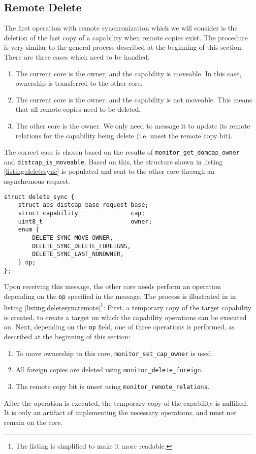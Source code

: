 \subsection{Remote Delete}
The first operation with remote synchronization which we will consider is the deletion of the last copy of a capability when remote copies exist. The procedure is very similar to the general process described at the beginning of this section. There are three cases which need to be handled:
\begin{enumerate}
    \item The current core is the owner, and the capability is moveable. In this case, ownership is transferred to the other core.
    \item The current core is the owner, and the capability is not moveable. This means that all remote copies need to be deleted.
    \item The other core is the owner. We only need to message it to update its remote relations for the capability being delete (i.e. unset the remote copy bit).
\end{enumerate}
The correct case is chosen based on the results of \texttt{monitor\_get\_domcap\_owner} and \texttt{distcap\_is\_moveable}. Based on this, the structure shown in listing \ref{listing:deletesync} is populated and sent to the other core through an asynchronous request.

\begin{lstlisting}[caption={Synchronization message for the delete operation},label={listing:deletesync}]
struct delete_sync {
    struct aos_distcap_base_request base;
    struct capability               cap;
    uint8_t                         owner;
    enum {
        DELETE_SYNC_MOVE_OWNER,
        DELETE_SYNC_DELETE_FOREIGNS,
        DELETE_SYNC_LAST_NONOWNER,
    } op;
};
\end{lstlisting}

Upon receiving this message, the other core needs perform an operation depending on the \texttt{op} specified in the message. The process is illustrated in in listing \ref{listing:deletesyncremote}\footnote{The listing is simplified to make it more readable.}: First, a temporary copy of the target capability is created, to create a target on which the capability operations can be executed on. Next, depending on the \texttt{op} field, one of three operations is performed, as described at the beginning of this section:
\begin{enumerate}
    \item To move ownership to this core, \texttt{monitor\_set\_cap\_owner} is used.
    \item All foreign copies are deleted using \texttt{monitor\_delete\_foreign}.
    \item The remote copy bit is unset using \texttt{monitor\_remote\_relations}.
\end{enumerate}
After the operation is executed, the temporary copy of the capability is nullified. It is only an artifact of implementing the necessary operations, and must not remain on the core.

